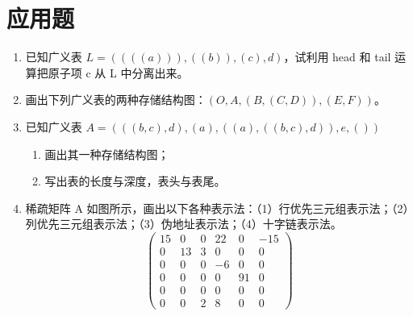 \documentclass[12pt, a4paper]{article}
\begin{document}
\section*{应用题}

\begin{enumerate}
	\item 已知广义表 $L=((((a))), ((b)), (c), d)$，试利用 head 和 tail 运算把原子项 c 从 L 中分离出来。
	\item 画出下列广义表的两种存储结构图：$(O, A, (B, (C, D)), (E, F))$。
	\item 已知广义表 $A=(((b,c),d),(a),((a),((b,c),d)),e,())$
	      \begin{enumerate}
		      \item 画出其一种存储结构图；
		      \item 写出表的长度与深度，表头与表尾。
	      \end{enumerate}
	\item 稀疏矩阵 A 如图所示，画出以下各种表示法：（1）行优先三元组表示法；（2）列优先三元组表示法；（3）伪地址表示法；（4）十字链表示法。
	      \[
		      \begin{pmatrix}
			      15 & 0  & 0 & 22 & 0  & -15 \\
			      0  & 13 & 3 & 0  & 0  & 0   \\
			      0  & 0  & 0 & -6 & 0  & 0   \\
			      0  & 0  & 0 & 0  & 91 & 0   \\
			      0  & 0  & 0 & 0  & 0  & 0   \\
			      0  & 0  & 2 & 8  & 0  & 0
		      \end{pmatrix}
	      \]
\end{enumerate}
\end{document}
